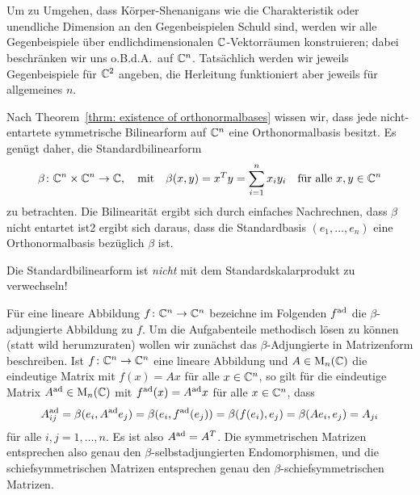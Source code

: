 \documentclass[a4paper,10pt,numbers=noenddot]{scrartcl}
\begin{document}
\section{}


Um zu Umgehen, dass Körper-Shenanigans wie die Charakteristik oder unendliche Dimension an den Gegenbeispielen Schuld sind, werden wir alle Gegenbeispiele über endlichdimensionalen $\mathbb{C}$-Vektorräumen konstruieren; dabei beschränken wir uns o.B.d.A.\ auf $\mathbb{C}^n$.
Tatsächlich werden wir jeweils Gegenbeispiele für $\mathbb{C}^2$ angeben, die Herleitung funktioniert aber jeweils für allgemeines $n$.

Nach Theorem~\ref{thrm: existence of orthonormalbases} wissen wir, dass jede nicht-entartete symmetrische Bilinearform auf $\mathbb{C}^n$ eine Orthonormalbasis besitzt.
Es genügt daher, die Standardbilinearform
\[
  \beta \colon \mathbb{C}^n \times \mathbb{C}^n \to \mathbb{C},
  \quad\text{mit}\quad
    \beta(x,y)
  = x^T y
  = \sum_{i=1}^n x_i y_i
  \quad
  \text{für alle $x, y \in \mathbb{C}^n$}
\]
zu betrachten.
Die Bilinearität ergibt sich durch einfaches Nachrechnen, dass $\beta$ nicht entartet ist2 ergibt sich daraus, dass die Standardbasis $(e_1, \dotsc, e_n)$ eine Orthonormalbasis bezüglich $\beta$ ist.

\begin{remark}
  Die Standardbilinearform ist \emph{nicht} mit dem Standardskalarprodukt zu verwechseln!
\end{remark}

Für eine lineare Abbildung $f \colon \mathbb{C}^n \to \mathbb{C}^n$ bezeichne im Folgenden $f^{\mathrm{ad}}$ die $\beta$-adjungierte Abbildung zu $f$.
Um die Aufgabenteile methodisch lösen zu können (statt wild herumzuraten) wollen wir zunächst das $\beta$-Adjungierte in Matrizenform beschreiben.
Ist $f \colon \mathbb{C}^n \to \mathbb{C}^n$ eine lineare Abbildung und $A \in \operatorname{M}_n(\mathbb{C})$ die eindeutige Matrix mit $f(x) = Ax$ für alle $x \in \mathbb{C}^n$, so gilt für die eindeutige Matrix $A^{\mathrm{ad}} \in \operatorname{M}_n(\mathbb{C})$ mit $f^{\mathrm{ad}}(x) = A^{\mathrm{ad}} x$ für alle $x \in \mathbb{C}^n$, dass
\[
    A^{\mathrm{ad}}_{ij}
  = \beta(e_i, A^{\mathrm{ad}} e_j)
  = \beta(e_i, f^{\mathrm{ad}}(e_j))
  = \beta(f(e_i), e_j)
  = \beta(A e_i, e_j)
  = A_{ji}
\]
für alle $i,j = 1, \dotsc, n$.
Es ist also $A^{\mathrm{ad}} = A^T$.
Die symmetrischen Matrizen entsprechen also genau den $\beta$-selbstadjungierten Endomorphismen, und die schiefsymmetrischen Matrizen entsprechen genau den $\beta$-schiefsymmetrischen Matrizen.
\end{document}
